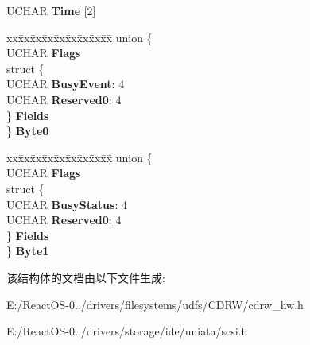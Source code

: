 \begin{DoxyCompactItemize}
\begin{tabbing}
\end{tabbing}\item 
\mbox{\label{struct___e_v_e_n_t___s_t_a_t___d_e_v___b_u_s_y___b_l_o_c_k_a42b5b3bb56d08a040c0a2db0de94ddf7}} 
U\+C\+H\+AR {\bfseries Time} \mbox{[}2\mbox{]}
\item 
\mbox{\label{struct___e_v_e_n_t___s_t_a_t___d_e_v___b_u_s_y___b_l_o_c_k_a2d6ae8b845cffb74c4e04ff2e1e3c54d}} 
\begin{tabbing}
xx\=xx\=xx\=xx\=xx\=xx\=xx\=xx\=xx\=\kill
union \{\\
\>UCHAR {\bfseries Flags}\\
\>struct \{\\
\>\>UCHAR {\bfseries BusyEvent}: 4\\
\>\>UCHAR {\bfseries Reserved0}: 4\\
\>\} {\bfseries Fields}\\
\} {\bfseries Byte0}\\

\end{tabbing}\item 
\mbox{\label{struct___e_v_e_n_t___s_t_a_t___d_e_v___b_u_s_y___b_l_o_c_k_a8dcb4bae2ed58e46283c89c291aa5558}} 
\begin{tabbing}
xx\=xx\=xx\=xx\=xx\=xx\=xx\=xx\=xx\=\kill
union \{\\
\>UCHAR {\bfseries Flags}\\
\>struct \{\\
\>\>UCHAR {\bfseries BusyStatus}: 4\\
\>\>UCHAR {\bfseries Reserved0}: 4\\
\>\} {\bfseries Fields}\\
\} {\bfseries Byte1}\\

\end{tabbing}\end{DoxyCompactItemize}


该结构体的文档由以下文件生成\+:\begin{DoxyCompactItemize}
\item 
E\+:/\+React\+O\+S-\/0../drivers/filesystems/udfs/\+C\+D\+R\+W/cdrw\+\_\+hw.\+h\item 
E\+:/\+React\+O\+S-\/0../drivers/storage/ide/uniata/scsi.\+h\end{DoxyCompactItemize}
